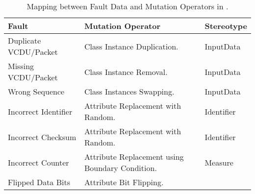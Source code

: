 \begin{table}[h]
\begin{center}
\begin{tabular}{|p{5cm}|p{5cm}|p{2.5cm}|}
\hline
\textbf{Fault}&\textbf{Mutation Operator}&\textbf{Stereotype}\\
\hline
Duplicate VCDU/Packet& Class Instance Duplication.&InputData\\
Missing VCDU/Packet& Class Instance Removal.&InputData\\
Wrong Sequence& Class Instances Swapping.&InputData\\
Incorrect Identifier& Attribute Replacement with Random.&Identifier\\
Incorrect Checksum& Attribute Replacement with Random.&Identifier\\
Incorrect Counter& Attribute Replacement using Boundary Condition.&Measure\\
Flipped Data Bits& Attribute Bit Flipping.&\\
\hline
\end{tabular}
\end{center}
\caption{Mapping between Fault Data and Mutation Operators in \cite{di2015generating}.}
\label{table:mapping}
\end{table}%